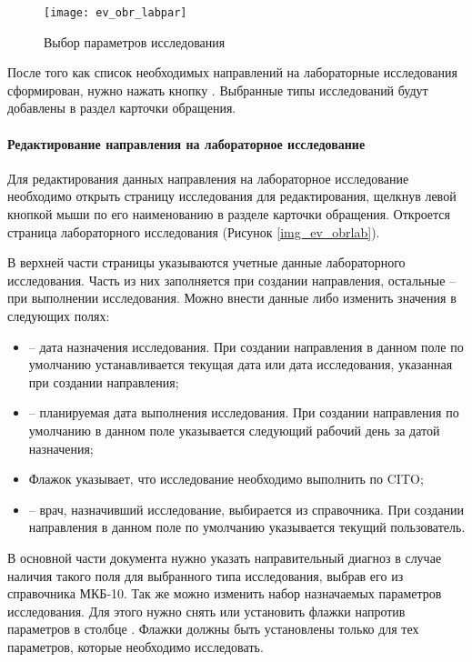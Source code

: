  \begin{figure}[ht]\centering
 	\texttt{[image: ev\_obr\_labpar]}
 	\caption{Выбор параметров исследования}
 	\label{img_ev_obr_labpar}
 \end{figure}
 
 
После того как список необходимых направлений на лабораторные исследования сформирован, нужно нажать кнопку . Выбранные типы исследований будут добавлены в раздел  карточки обращения.

\paragraph{Редактирование направления на лабораторное исследование}

Для редактирования данных направления на лабораторное исследование необходимо открыть страницу исследования для редактирования, щелкнув левой кнопкой мыши по его наименованию в разделе  карточки обращения. Откроется страница лабораторного исследования (Рисунок \ref{img_ev_obrlab}).

В верхней части страницы указываются учетные данные лабораторного исследования. Часть из них заполняется при создании направления, остальные -- при выполнении исследования. Можно внести данные либо изменить значения в следующих полях:

\begin{itemize}
 \item {} -- дата назначения исследования. При создании направления в данном поле по умолчанию устанавливается текущая дата или дата исследования, указанная при создании направления;
 \item {} -- планируемая дата выполнения исследования. При создании направления по умолчанию в данном поле указывается следующий рабочий день за датой назначения;
 \item Флажок  указывает, что исследование необходимо выполнить по CITO;
 \item {} -- врач, назначивший исследование, выбирается из справочника. При создании направления в данном поле по умолчанию указывается текущий пользователь.  
\end{itemize} 


В основной части документа нужно указать направительный диагноз в случае наличия такого поля для выбранного типа исследования, выбрав его из справочника МКБ-10. Так же можно изменить набор назначаемых параметров исследования. Для этого нужно снять или установить флажки напротив параметров в столбце . Флажки должны быть установлены только для тех параметров, которые необходимо исследовать.  

